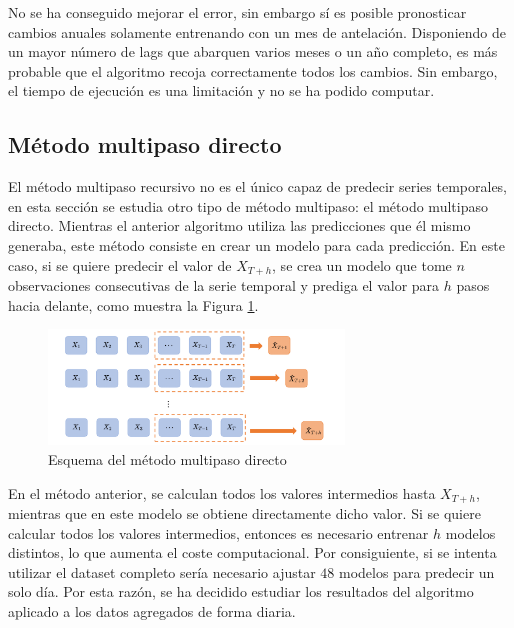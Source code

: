 \documentclass[12pt,twoside]{article}
\begin{document}

No se ha conseguido mejorar el error, sin embargo sí es posible pronosticar cambios anuales solamente entrenando con un mes de antelación. Disponiendo de un mayor número de lags que abarquen varios meses o un año completo, es más probable que el algoritmo recoja correctamente todos los cambios. Sin embargo, el tiempo de ejecución es una limitación y no se ha podido computar.



\subsection{Método multipaso directo}
El método multipaso recursivo no es el único capaz de predecir series temporales, en esta sección se estudia otro tipo de método multipaso: el método multipaso directo. Mientras el anterior algoritmo utiliza las predicciones que él mismo generaba, este método consiste en crear un modelo para cada predicción. En este caso, si se quiere predecir el valor de $X_{T+h}$, se crea un modelo que tome $n$ observaciones consecutivas de la serie temporal y prediga el valor para $h$ pasos hacia delante, como muestra la Figura \ref{fig:multistep-direct}.
\begin{figure}[h]
\centering
    \includegraphics[width = 0.7\textwidth]{imagenes/multistep-direct.png}
    \caption{Esquema del método multipaso directo}\label{fig:multistep-direct}
\end{figure}


En el método anterior, se calculan todos los valores intermedios hasta $X_{T+h}$, mientras que en este modelo se obtiene directamente dicho valor. Si se quiere calcular todos los valores intermedios, entonces es necesario entrenar $h$ modelos distintos, lo que aumenta el coste computacional. Por consiguiente, si se intenta utilizar el dataset completo sería necesario ajustar $48$ modelos para predecir un solo día. Por esta razón, se ha decidido estudiar los resultados del algoritmo aplicado a los datos agregados de forma diaria. 
\end{document}
